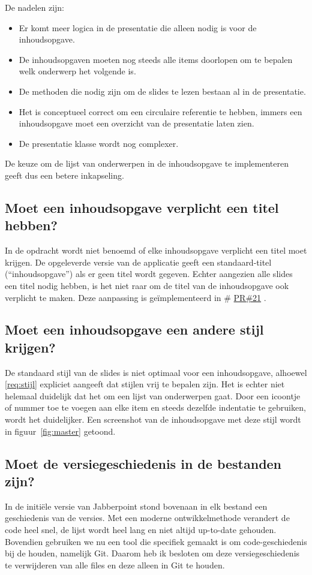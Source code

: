 \documentclass[a4paper]{article}
\makeatletter
\newcommand*{\repo}{\begingroup\@makeother\#\@repo}
\newcommand*{\@repo}[2]{%
  \href{https://github.com/DanielSchiavini/design-patterns-assignment/#1}{#2}%
  \endgroup}
\newcommand{\PR}[1]{\repo{pull/#1}{PR\##1}}
\newcommand{\reqref}[1]{\ref{req:#1}}
\newcommand{\question}[1]{
  \subsection{#1}
}
\makeatother
\begin{document}
		De nadelen zijn:
		\begin{itemize}
			\item Er komt meer logica in de presentatie die alleen nodig is voor de in\-houds\-op\-gave.
			\item De inhoudsopgaven moeten nog steeds alle items doorlopen om te bepalen welk onderwerp het volgende is.
			\item De methoden die nodig zijn om de slides te lezen bestaan al in de presentatie.
			\item Het is conceptueel correct om een circulaire referentie te hebben, immers een inhoudsopgave moet een overzicht van de presentatie laten zien.
			\item De presentatie klasse wordt nog complexer.
		\end{itemize}

		De keuze om de lijst van onderwerpen in de inhoudsopgave te implementeren geeft dus een betere inkapseling.

    \question{Moet een inhoudsopgave verplicht een titel hebben?}
		In de opdracht wordt niet benoemd of elke inhoudsopgave verplicht een titel moet krijgen.
		De opgeleverde versie van de applicatie geeft een standaard-titel (``inhoudsopgave'') als er geen titel wordt gegeven.
		Echter aangezien alle slides een titel nodig hebben, is het niet raar om de titel van de inhoudsopgave ook verplicht te maken.
		Deze aanpassing is geïmplementeerd in \PR{21}.
    
    \question{Moet een inhoudsopgave een andere stijl krijgen?}
		De standaard stijl van de slides is niet optimaal voor een inhoudsopgave, alhoewel \reqref{stijl} expliciet aangeeft dat stijlen vrij te bepalen zijn.
		Het is echter niet helemaal duidelijk dat het om een lijst van onderwerpen gaat.
		Door een icoontje of nummer toe te voegen aan elke item en steeds dezelfde indentatie te gebruiken, wordt het duidelijker.
		Een screenshot van de inhoudsopgave met deze stijl wordt in figuur~\ref{fig:master} getoond.

    \question{Moet de versiegeschiedenis in de bestanden zijn?}
		In de initiële versie van Jabberpoint stond bovenaan in elk bestand een geschiedenis van de versies.
		Met een moderne ontwikkelmethode verandert de code heel snel, de lijst wordt heel lang en niet altijd up-to-date gehouden.
		Bovendien gebruiken we nu een tool die specifiek gemaakt is om code-geschiedenis bij de houden, namelijk Git.
		Daarom heb ik besloten om deze versiegeschiedenis te verwijderen van alle files en deze alleen in Git te houden.
\end{document}

